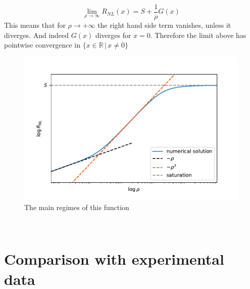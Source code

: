 \begin{equation}
    \lim_{\rho\to\infty} R_{NL}(x)=S + \frac 1\rho G(x)
\end{equation}
This means that for $\rho\to +\infty$ the right hand side term vanishes, unless it diverges. And indeed $G(x)$ diverges for $x=0$. Therefore the limit above has pointwise convergence in $\{x\in \mathbb R\,|\,x\neq 0\}$
\begin{figure}[h!]
    \centering
    \includegraphics[width=\linewidth]{Immagini/rnl/all_approx_rho.pdf}
    \caption{The main regimes of this function}
    \label{fig:all_approx_rho}
\end{figure}\\

\section{Comparison with experimental data}
